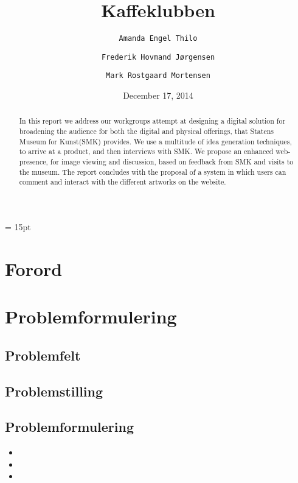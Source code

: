 \documentclass[final]{rapport1}
\begin{document}
\begin{titlepage}
%
\end{titlepage}

\title{Kaffeklubben}
\author{
    \texttt{Amanda Engel Thilo}\\
  \and
      \texttt{Frederik Hovmand Jørgensen}\\
  \and
      \texttt{Mark Rostgaard Mortensen}
      }
\date{December 17, 2014}


\maketitle
 
\baselineskip= 15pt

\begin{abstract}

In this report we address our workgroups attempt at designing a digital solution for broadening the audience for both the digital and physical offerings, that Statens Museum for Kunst(SMK) provides. We use a multitude of idea generation techniques, to arrive at a product, and then interviews with SMK. We propose an enhanced web-presence, for image viewing and discussion, based on feedback from SMK and visits to the museum. The report concludes with the proposal of a system in which users can comment and interact with the different artworks on the website.


\end{abstract}
\clearpage
\tableofcontents
\chapter{Forord}


\chapter{Problemformulering}

\section{Problemfelt}

\section{Problemstilling}


\section{Problemformulering}
\begin{itemize}
\item 

\item 

\item 
\end{itemize}
\end{document}
